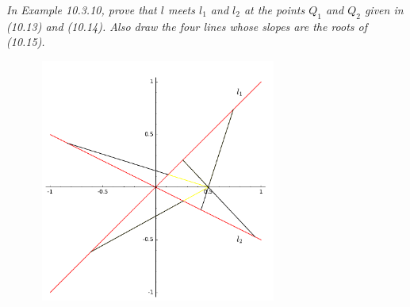\documentclass[11pt,a4paper]{article}
\begin{document}
{\it In Example 10.3.10, prove that $l$ meets $l_1$ and $l_2$ at the points $Q_1$ and $Q_2$ given in (10.13) and (10.14). Also draw the four lines whose slopes are the roots of (10.15).
}
\begin{figure}[htbp]
\begin{center}
\includegraphics [width=8cm,height=8cm] {marquedRulers.pdf}
\end{center}
\end{figure}
\end{document}
